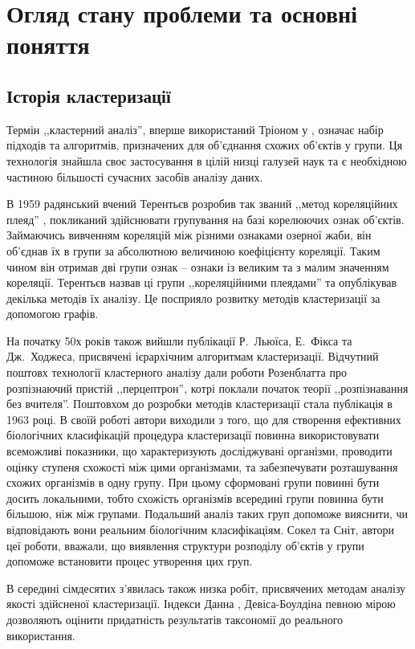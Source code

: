 \chapter{Огляд стану проблеми та основні поняття}\label{ch:01}

\section{Історія кластеризації}
    Термін ,,кластерний аналіз'', вперше використаний Тріоном у \cite{Tryon:Cluster:1939}, означає набір підходів та алгоритмів, призначених для об'єднання схожих об'єктів у групи. Ця технологія знайшла своє застосування в цілій низці галузей наук та є необхідною частиною більшості сучасних засобів аналізу даних.
 
    В 1959 радянський вчений Терентьєв розробив так званий ,,метод кореляційних плеяд'' \cite{Terentyev}, покликаний здійснювати групування на базі корелюючих ознак об'єктів. Займаючись вивченням кореляцій між різними ознаками озерної жаби, він об'єднав їх в групи за абсолютною величиною коефіцієнту кореляції. Таким чином він отримав дві групи ознак -- ознаки із великим та з малим значенням кореляції. Терентьєв назвав ці групи ,,кореляційними плеядами'' та опублікував декілька методів їх аналізу. Це посприяло розвитку методів кластеризації за допомогою графів.
    
    На початку 50х років також вийшли публікації Р.~Льюїса, Е.~Фікса та Дж.~Ходжеса, присвячені ієрархічним алгоритмам кластеризації. Відчутний поштовх технології кластерного аналізу дали роботи Розенблатта про розпізнаючий пристій ,,перцептрон'', котрі поклали початок теорії ,,розпізнавання без вчителя''. Поштовхом до розробки методів кластеризації стала публікація \cite{SokalSneath} в 1963 році. В своїй роботі автори виходили з того, що для створення ефективних біологічних класифікацій процедура кластеризації повинна використовувати всеможливі показники, що характеризують досліджувані організми, проводити оцінку ступеня схожості між цими організмами, та забезпечувати розташування схожих організмів в одну групу. При цьому сформовані групи повинні бути досить локальними, тобто схожість організмів всередині групи повинна бути більшою, ніж між групами. Подальший аналіз таких груп допоможе вияснити, чи відповідають вони реальним біологічним класифікаціям. Сокел та Сніт, автори цеї роботи, вважали, що виявлення структури розподілу об'єктів у групи допоможе встановити процес утворення цих груп.
    
    В середині сімдесятих з'явилась також низка робіт, присвячених методам аналізу якості здійсненої кластеризації. Індекси Данна \cite{Dunn}, Девіса-Боулдіна \cite{DavisBouldin} певною мірою дозволяють оцінити придатність результатів таксономії до реального використання.
    
